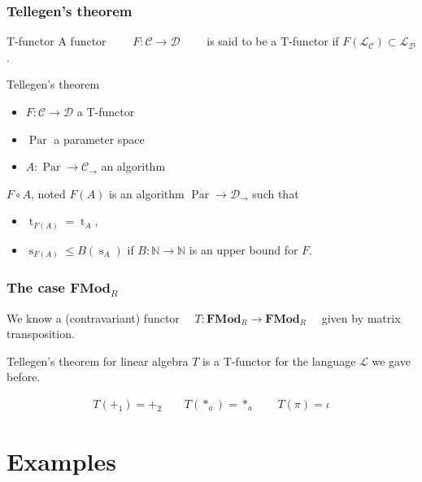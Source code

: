 \documentclass[10pt,handout]{beamer}
\newcommand{\cat}[1]{\mathscr{#1}}
\newcommand{\lcat}[1]{\mathbf{#1}}
\newcommand{\C}{\cat{C}}
\newcommand{\D}{\cat{D}}
\renewcommand{\L}{\cat{L}}
\newcommand{\comp}{\circ}
\newcommand{\N}{\mathbb{N}}
\newcommand{\ra}{\rightarrow}
\DeclareMathOperator{\Time}{t}
\DeclareMathOperator{\Space}{s}
\DeclareMathOperator{\Par}{Par}
\begin{document}
\begin{frame}
  \frametitle{Tellegen's theorem}

  \begin{block}{T-functor}
    A functor $\qquad F:\C\ra\D \qquad$ is said to be a T-functor if
    $F(\L_\C) \subset \L_\D$.
  \end{block}

  \begin{block}{Tellegen's theorem}
    \begin{itemize}
    \item $F:\C\ra\D$ a T-functor
    \item $\Par$ a parameter space
    \item $A:\Par\ra\C_\ra$ an algorithm
    \end{itemize}

    $F\comp A$, noted $F(A)$ is an algorithm $\Par\ra\D_\ra$ such that
    \begin{itemize}
    \item $\Time_{F(A)} = \Time_A$,
    \item $\Space_{F(A)} \le B(\Space_A)$ if $B:\N\ra\N$ is an upper
      bound for $F$.
    \end{itemize}
  \end{block}
\end{frame}


\begin{frame}
  \frametitle{The case $\lcat{FMod}_R$}
  
  \begin{center}
    We know a (contravariant) functor $\quad
    T:\lcat{FMod}_R\ra\lcat{FMod}_R\quad$ given by matrix
    transposition.
  \end{center}

  \begin{block}{Tellegen's theorem for linear algebra}
    $T$ is a T-functor for the language $\L$ we gave before.
  \end{block}

  \begin{align*}
    T(+_1) = +_2 \qquad T(*_a) = *_a \qquad T(\pi) = \iota
  \end{align*}
\end{frame}



\section{Examples}
\end{document}

